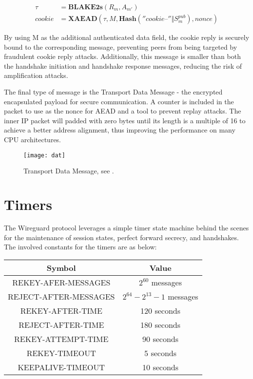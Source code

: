     \begin{align*}
      \tau &= \textbf{BLAKE2s}(R_m, A_{m'}) \\
      cookie &= \textbf{XAEAD}(\tau, M, \textbf{Hash}(''cookie\texttt{--}'' \Vert S^{pub}_m), nonce)
    \end{align*}

    By using M as the additional authenticated data field, the cookie reply is securely bound 
    to the corresponding message, preventing peers from being targeted by fraudulent cookie 
    reply attacks. Additionally, this message is smaller than both the handshake initiation and 
    handshake response messages, reducing the risk of amplification attacks.

    The final type of message is the Transport Data Message - the encrypted encapsulated payload
    for secure communication. A counter is included in the packet to use as the nonce for AEAD
    and a tool to prevent replay attacks. The inner IP packet will padded with zero bytes until
    its length is a multiple of 16 to achieve a better address alignment, thus improving the
    performance on many CPU architectures.

    \begin{figure}[h]
      \centering
      \texttt{[image: dat]}
      \caption{Transport Data Message, see \cite[p.~12]{wireguard}.}
      \label{fig:transdata}
    \end{figure} 


\section{Timers} \label{w4}
The Wireguard protocol leverages a simple timer state machine behind the scenes for the 
maintenance of session states, perfect forward secrecy, and handshakes. The involved constants
for the timers are as below:

\begin{center}
  \begin{tabular}{|c | c|} 
   \hline
   Symbol & Value \\
   \hline\hline
   \uppercase{Rekey-Afer-Messages} & $2^{60}$ messages \\ 
   \hline
   \uppercase{Reject-After-Messages} & $2^{64} - 2^{13} - 1$ messages \\
   \hline
   \uppercase{REKEY-AFTER-TIME} & 120 seconds \\
   \hline
   \uppercase{reject-after-time} & 180 seconds \\
   \hline
   \uppercase{rekey-attempt-time} & 90 seconds \\
   \hline
   \uppercase{rekey-timeout} & 5 seconds \\
   \hline
   \uppercase{keepalive-timeout} & 10 seconds \\
   \hline
  \end{tabular}
  \end{center}

